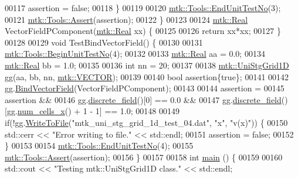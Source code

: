 \begin{DoxyCode}
00117     assertion = \textcolor{keyword}{false};
00118   \}
00119 
00120   \hyperlink{classmtk_1_1Tools_aba67d9dc35c9c1c49430fcc9ea035e03}{mtk::Tools::EndUnitTestNo}(3);
00121   \hyperlink{classmtk_1_1Tools_ac6804df469c94ab6a796fb64f1e44a89}{mtk::Tools::Assert}(assertion);
00122 \}
00123 
00124 \hyperlink{group__c01-roots_gac080bbbf5cbb5502c9f00405f894857d}{mtk::Real} VectorFieldPComponent(\hyperlink{group__c01-roots_gac080bbbf5cbb5502c9f00405f894857d}{mtk::Real} xx) \{
00125 
00126   \textcolor{keywordflow}{return} xx*xx;
00127 \}
00128 
00129 \textcolor{keywordtype}{void} TestBindVectorField() \{
00130 
00131   \hyperlink{classmtk_1_1Tools_afc29ecaf337a13ed2e817d3890a5a441}{mtk::Tools::BeginUnitTestNo}(4);
00132 
00133   \hyperlink{group__c01-roots_gac080bbbf5cbb5502c9f00405f894857d}{mtk::Real} aa = 0.0;
00134   \hyperlink{group__c01-roots_gac080bbbf5cbb5502c9f00405f894857d}{mtk::Real} bb = 1.0;
00135 
00136   \textcolor{keywordtype}{int} nn = 20;
00137 
00138   \hyperlink{classmtk_1_1UniStgGrid1D}{mtk::UniStgGrid1D} gg(aa, bb, nn, \hyperlink{namespacemtk_ga4c54f2a329cfb4e56213b02a259d19e2a3d8cb27a993651a74d67fb8c98ae91b2}{mtk::VECTOR});
00139 
00140   \textcolor{keywordtype}{bool} assertion\{\textcolor{keyword}{true}\};
00141 
00142   gg.\hyperlink{classmtk_1_1UniStgGrid1D_a5703f1f875f52f6de8f7db5a6250fafa}{BindVectorField}(VectorFieldPComponent);
00143 
00144   assertion =
00145     assertion &&
00146     gg.\hyperlink{classmtk_1_1UniStgGrid1D_ab9c3f9ee2ac76a351b01e4abfede4d19}{discrete\_field}()[0] == 0.0 &&
00147     gg.\hyperlink{classmtk_1_1UniStgGrid1D_ab9c3f9ee2ac76a351b01e4abfede4d19}{discrete\_field}()[gg.\hyperlink{classmtk_1_1UniStgGrid1D_af1b3729d8afa07be5b2775ed68015b80}{num\_cells\_x}() + 1 - 1] == 1.0;
00148 
00149   \textcolor{keywordflow}{if}(!gg.\hyperlink{classmtk_1_1UniStgGrid1D_a6d2c10aa9468a037829f0eb043b898dc}{WriteToFile}(\textcolor{stringliteral}{"mtk\_uni\_stg\_grid\_1d\_test\_04.dat"}, \textcolor{stringliteral}{"x"}, \textcolor{stringliteral}{"v(x)"})) \{
00150     std::cerr << \textcolor{stringliteral}{"Error writing to file."} << std::endl;
00151     assertion = \textcolor{keyword}{false};
00152   \}
00153 
00154   \hyperlink{classmtk_1_1Tools_aba67d9dc35c9c1c49430fcc9ea035e03}{mtk::Tools::EndUnitTestNo}(4);
00155   \hyperlink{classmtk_1_1Tools_ac6804df469c94ab6a796fb64f1e44a89}{mtk::Tools::Assert}(assertion);
00156 \}
00157 
00158 \textcolor{keywordtype}{int} \hyperlink{mtk__uni__stg__grid__1d__test_8cc_ae66f6b31b5ad750f1fe042a706a4e3d4}{main} () \{
00159 
00160   std::cout << \textcolor{stringliteral}{"Testing mtk::UniStgGrid1D class."} << std::endl;

\end{DoxyCode}
